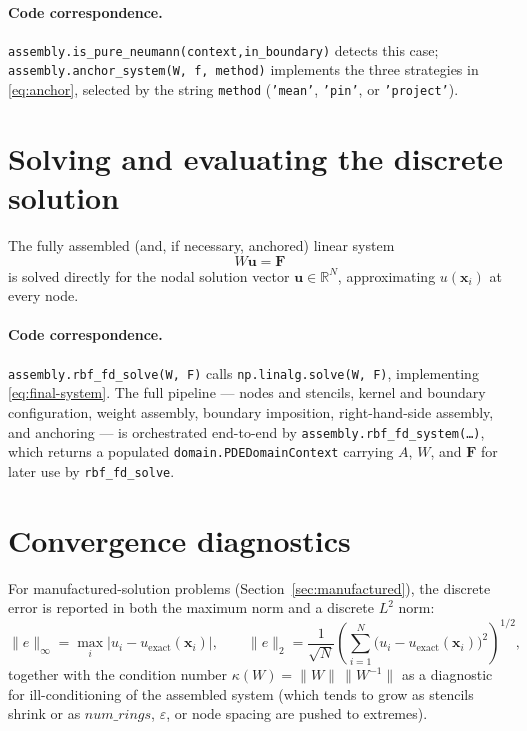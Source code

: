 \documentclass[11pt]{article}
\newcommand{\bx}{\mathbf{x}}
\newcommand{\R}{\mathbb{R}}
\begin{document}
\paragraph{Code correspondence.}
\texttt{assembly.is\_pure\_neumann(context,in\_boundary)} detects this
case; \texttt{assembly.anchor\_system(W, f, method)} implements the
three strategies in \eqref{eq:anchor}, selected by the string
\texttt{method} (\texttt{'mean'}, \texttt{'pin'}, or \texttt{'project'}).

\section{Solving and evaluating the discrete solution}

The fully assembled (and, if necessary, anchored) linear system
\begin{equation}
  W\mathbf{u} = \mathbf{F}
  \label{eq:final-system}
\end{equation}
is solved directly for the nodal solution vector $\mathbf{u} \in
\R^N$, approximating $u(\bx_i)$ at every node.

\paragraph{Code correspondence.}
\texttt{assembly.rbf\_fd\_solve(W, F)} calls
\texttt{np.linalg.solve(W, F)}, implementing \eqref{eq:final-system}.
The full pipeline --- nodes and stencils, kernel and boundary
configuration, weight assembly, boundary imposition, right-hand-side
assembly, and anchoring --- is orchestrated end-to-end by
\texttt{assembly.rbf\_fd\_system(\dots)}, which returns a populated
\texttt{domain.PDEDomainContext} carrying $A$, $W$, and $\mathbf{F}$
for later use by \texttt{rbf\_fd\_solve}.

\section{Convergence diagnostics}

For manufactured-solution problems (Section~\ref{sec:manufactured}),
the discrete error is reported in both the maximum norm and a
discrete $L^2$ norm:
\begin{equation}
  \|e\|_\infty = \max_i |u_i - u_{\text{exact}}(\bx_i)|,
  \qquad
  \|e\|_{2} = \frac{1}{\sqrt{N}}
  \left(\sum_{i=1}^N \big(u_i - u_{\text{exact}}(\bx_i)\big)^2\right)^{1/2},
  \label{eq:errors}
\end{equation}
together with the condition number $\kappa(W) =
\|W\|\,\|W^{-1}\|$ as a diagnostic for ill-conditioning of the
assembled system (which tends to grow as stencils shrink or as $num\_rings$,
$\varepsilon$, or node spacing are pushed to extremes).
\end{document}
